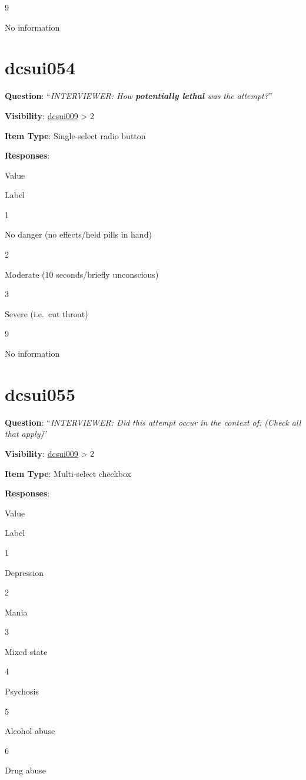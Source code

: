 \documentclass[]{book}
\begin{document}
9

No information

\hypertarget{dcsui054}{%
\section{dcsui054}\label{dcsui054}}

\textbf{Question}: ``\emph{INTERVIEWER: How \textbf{potentially lethal} was the attempt?}''

\textbf{Visibility}: \protect\hyperlink{dcsui009}{dcsui009} \textgreater{} 2

\textbf{Item Type}: Single-select radio button

\textbf{Responses}:

Value

Label

1

No danger (no effects/held pills in hand)

2

Moderate (10 seconds/briefly unconscious)

3

Severe (i.e.~cut throat)

9

No information

\hypertarget{dcsui055}{%
\section{dcsui055}\label{dcsui055}}

\textbf{Question}: ``\emph{INTERVIEWER: Did this attempt occur in the context of: (Check all that apply)}''

\textbf{Visibility}: \protect\hyperlink{dcsui009}{dcsui009} \textgreater{} 2

\textbf{Item Type}: Multi-select checkbox

\textbf{Responses}:

Value

Label

1

Depression

2

Mania

3

Mixed state

4

Psychosis

5

Alcohol abuse

6

Drug abuse
\end{document}

